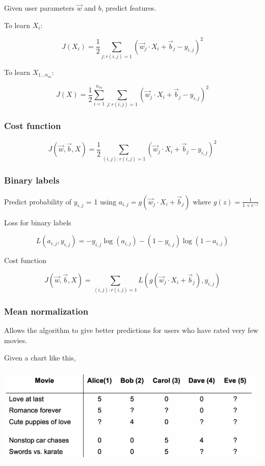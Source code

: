 \documentclass[12pt]{article}
\begin{document}
Given user parameters $\vec{w}$ and $b$, predict features.

To learn $X_i$:

\[ J(X_i) = \frac 1 2 \sum_{j:r(i,j)=1} (\vec w_j \cdot X_i + \vec b_j - y_{i,j})^2 \]

To learn $X_{1 \ldots n_m}$:

\[ J(X) = \frac 1 2 \sum_{i=1}^{n_m} \sum_{j:r(i,j)=1} (\vec w_j \cdot X_i + \vec b_j - y_{i,j})^2 \]

\subsubsection{Cost function}

\[ J(\vec w, \vec b, X) = \frac 1 2 \sum_{(i,j):r(i,j)=1} (\vec w_j \cdot X_i + \vec b_j - y_{i,j})^2 \]

\subsubsection{Binary labels}

Predict probability of $y_{i,j}$ = 1 using $a_{i,j} = g(\vec w_j \cdot X_i + \vec b_j)$ where $g(z) = \frac 1 {1 + e^{-z}}$

Loss for binary labels

\[ L(a_{i,j},y_{i,j}) = -y_{i,j} \log(a_{i,j}) - (1 - y_{i,j}) \log(1 - a_{i,j}) \]

Cost function

\[ J(\vec w, \vec b, X) = \sum_{(i,j):r(i,j)=1} L(g(\vec w_j \cdot X_i + \vec b_j),y_{i,j}) \]

\subsubsection{Mean normalization}

Allows the algorithm to give better predictions for users who have rated very few movies.

Given a chart like this,

\includegraphics[scale=.5]{movies}
\end{document}
